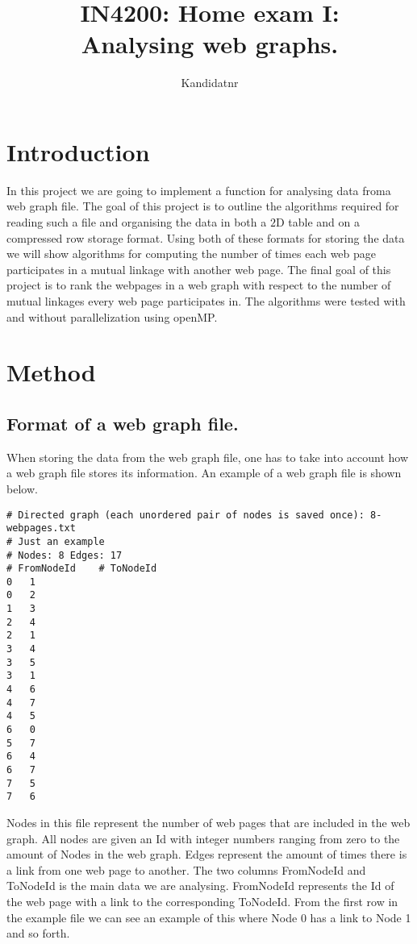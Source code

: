 \documentclass[onecolumn]{aastex62}
\begin{document}
\title{\Large IN4200: Home exam I:\\Analysing web graphs.}



\author{Kandidatnr}



\section{Introduction} \label{sec:intro}
In this project we are going to implement a function for analysing data froma web graph file. The goal of this project is to outline the algorithms required for reading such a file and organising the data in both a $2$D table and on a compressed row storage format. Using both of these formats for storing the data we will show algorithms for computing the number of times each web page participates in a mutual linkage with another web page. The final goal of this project is to rank the webpages in a web graph with respect to the number of mutual linkages every web page participates in. The algorithms were tested with and without parallelization using openMP.
 
\section{Method} \label{sec:method}
\subsection{Format of a web graph file.}
When storing the data from the web graph file, one has to take into account how a web graph file stores its information. An example of a web graph file is shown below.
\begin{lstlisting}
# Directed graph (each unordered pair of nodes is saved once): 8-webpages.txt 
# Just an example
# Nodes: 8 Edges: 17
# FromNodeId    # ToNodeId
0   1
0   2
1   3
2   4
2   1
3   4
3   5
3   1
4   6
4   7
4   5
6   0
5   7
6   4
6   7
7   5
7   6
\end{lstlisting}
Nodes in this file represent the number of web pages that are included in the web graph. All nodes are given an Id with integer numbers ranging from zero to the amount of Nodes in the web graph. Edges represent the amount of times there is a link from one web page to another. The two columns FromNodeId and ToNodeId is the main data we are analysing. FromNodeId represents the Id of the web page with a link to the corresponding ToNodeId. From the first row in the example file we can see an example of this where Node 0 has a link to Node 1 and so forth.
\end{document}
